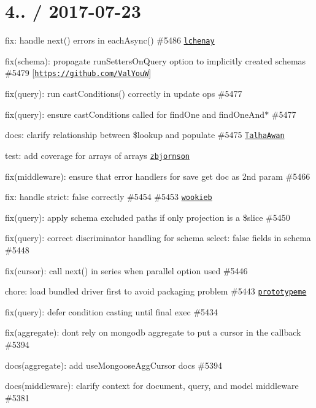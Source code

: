 \section*{4.. / 2017-\/07-\/23 }


\begin{DoxyItemize}
\item fix\+: handle next() errors in {\ttfamily each\+Async()} \#5486 \href{https://github.com/lchenay}{\tt lchenay}
\item fix(schema)\+: propagate run\+Setters\+On\+Query option to implicitly created schemas \#5479 \mbox{[}\href{https://github.com/ValYouW}{\tt https\+://github.\+com/\+Val\+YouW}\mbox{]}
\item fix(query)\+: run cast\+Conditions() correctly in update ops \#5477
\item fix(query)\+: ensure cast\+Conditions called for find\+One and find\+One\+And$\ast$ \#5477
\item docs\+: clarify relationship between \$lookup and populate \#5475 \href{https://github.com/TalhaAwan}{\tt Talha\+Awan}
\item test\+: add coverage for arrays of arrays \href{https://github.com/zbjornson}{\tt zbjornson}
\item fix(middleware)\+: ensure that error handlers for save get doc as 2nd param \#5466
\item fix\+: handle strict\+: false correctly \#5454 \#5453 \href{https://github.com/wookieb}{\tt wookieb}
\item fix(query)\+: apply schema excluded paths if only projection is a \$slice \#5450
\item fix(query)\+: correct discriminator handling for schema {\ttfamily select\+: false} fields in schema \#5448
\item fix(cursor)\+: call next() in series when parallel option used \#5446
\item chore\+: load bundled driver first to avoid packaging problem \#5443 \href{https://github.com/prototypeme}{\tt prototypeme}
\item fix(query)\+: defer condition casting until final exec \#5434
\item fix(aggregate)\+: don\textquotesingle{}t rely on mongodb aggregate to put a cursor in the callback \#5394
\item docs(aggregate)\+: add use\+Mongoose\+Agg\+Cursor docs \#5394
\item docs(middleware)\+: clarify context for document, query, and model middleware \#5381
\end{DoxyItemize}

